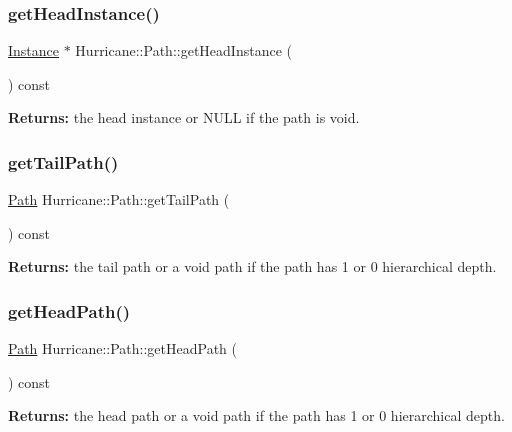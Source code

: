 \subsubsection{\texorpdfstring{get\+Head\+Instance()}{getHeadInstance()}}
{\footnotesize\ttfamily \mbox{\hyperlink{classHurricane_1_1Instance}{Instance}} $\ast$ Hurricane\+::\+Path\+::get\+Head\+Instance (\begin{DoxyParamCaption}{ }\end{DoxyParamCaption}) const}

{\bfseries Returns\+:} the head instance or N\+U\+LL if the path is void. \mbox{\label{classHurricane_1_1Path_af0b27566643cc252d9a0feb1709d3180}} 
\subsubsection{\texorpdfstring{get\+Tail\+Path()}{getTailPath()}}
{\footnotesize\ttfamily \mbox{\hyperlink{classHurricane_1_1Path}{Path}} Hurricane\+::\+Path\+::get\+Tail\+Path (\begin{DoxyParamCaption}{ }\end{DoxyParamCaption}) const}

{\bfseries Returns\+:} the tail path or a void path if the path has 1 or 0 hierarchical depth. \mbox{\label{classHurricane_1_1Path_ae89034b297b27545cf3865e0cfa31f3d}} 
\subsubsection{\texorpdfstring{get\+Head\+Path()}{getHeadPath()}}
{\footnotesize\ttfamily \mbox{\hyperlink{classHurricane_1_1Path}{Path}} Hurricane\+::\+Path\+::get\+Head\+Path (\begin{DoxyParamCaption}{ }\end{DoxyParamCaption}) const}

{\bfseries Returns\+:} the head path or a void path if the path has 1 or 0 hierarchical depth. \mbox{\label{classHurricane_1_1Path_a1f9350514c4751b54b2f01082a93e3bf}} 
